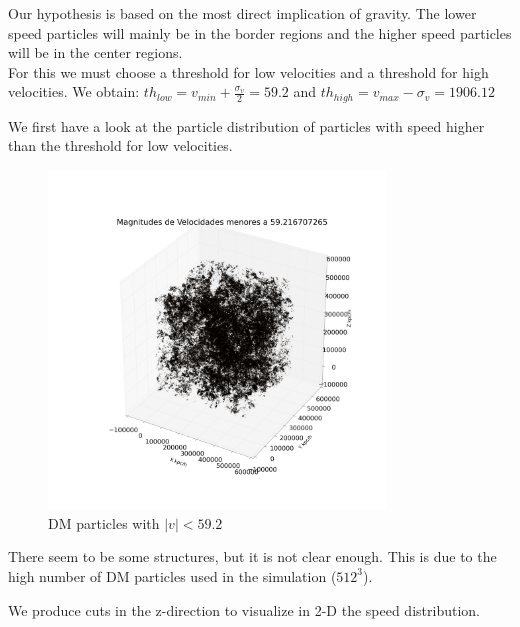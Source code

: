 \documentclass[12pt]{article}
\begin{document}
Our hypothesis is based on the most direct implication of gravity. The lower speed
particles will mainly be in the border regions and the higher speed particles
will be in the center regions. \\

For this we must choose a threshold for low velocities and a threshold for high velocities. 
We obtain: $th_{low} = v_{min} + \frac{\sigma_{v}}{2} = 59.2$ and $th_{high} = v_{max}  - \sigma_{v} = 1906.12 $

We first have a look at the particle distribution of particles with speed higher than the
threshold for low velocities.\\
\begin{figure}[ht]
\begin{center}
\includegraphics[width=0.8\textwidth]{graphs/pos_3d_vel_menor_s_smaller.png} %
\caption{DM particles with $|v| < 59.2 $}
\label{fg:3d_thresh_low}
\end{center}
\end{figure}
\FloatBarrier

There seem to be some structures, but it is not clear enough. This is due to the high number of DM particles used in the simulation ($512^3$). 


We produce cuts in the z-direction to visualize in 2-D the speed distribution. \\
\end{document}
